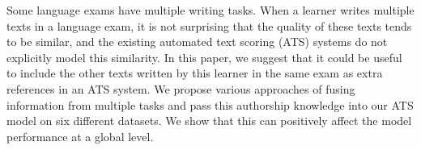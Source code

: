 Some language exams have multiple writing tasks. When a learner writes multiple texts in a language exam, it is not surprising that the quality of these texts tends to be similar, and the existing automated text scoring (ATS) systems do not explicitly model this similarity. In this paper, we suggest that it could be useful to include the other texts written by this learner in the same exam as extra references in an ATS system. We propose various approaches of fusing information from multiple tasks and pass this authorship knowledge into our ATS model on six different datasets. We show that this can positively affect the model performance at a global level.
